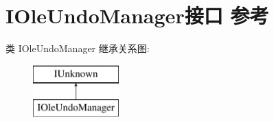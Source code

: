 \hypertarget{interface_i_ole_undo_manager}{}\section{I\+Ole\+Undo\+Manager接口 参考}
\label{interface_i_ole_undo_manager}
类 I\+Ole\+Undo\+Manager 继承关系图\+:\begin{figure}[H]
\begin{center}
\leavevmode
\includegraphics[height=2.000000cm]{interface_i_ole_undo_manager}
\end{center}
\end{figure}
